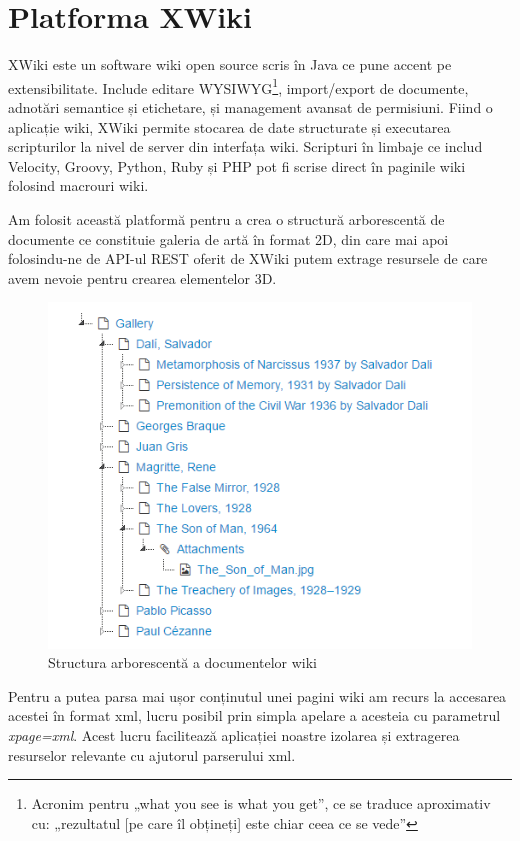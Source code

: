 \section{Platforma XWiki}

XWiki este un software wiki open source scris în Java ce pune accent pe extensibilitate. Include editare WYSIWYG\footnote{Acronim pentru „what you see is what you get”, ce se traduce aproximativ cu: „rezultatul [pe care îl obțineți] este chiar ceea ce se vede”}, import/export de documente, adnotări semantice și etichetare, și management avansat de permisiuni.
Fiind o aplicație wiki, XWiki permite stocarea de date structurate și executarea scripturilor la nivel de server din interfața wiki. Scripturi în limbaje ce includ Velocity, Groovy, Python, Ruby și PHP pot fi scrise direct în paginile wiki folosind macrouri wiki.


Am folosit această platformă pentru a crea o structură arborescentă de documente ce constituie galeria de artă în format 2D, din care mai apoi folosindu-ne de API-ul REST oferit de XWiki  putem extrage resursele de care avem nevoie pentru crearea elementelor 3D.

\begin{figure}[h]
  \centering
  \includegraphics[scale=1.1]{img/docTree.png}
  \caption{Structura arborescentă a documentelor wiki}
\end{figure}
\clearpage

Pentru a putea parsa mai ușor conținutul unei pagini wiki am recurs la accesarea acestei în format xml, lucru posibil prin simpla apelare a acesteia cu parametrul \textit{xpage=xml}.
Acest lucru facilitează aplicației noastre izolarea și extragerea resurselor relevante cu ajutorul parserului xml.

